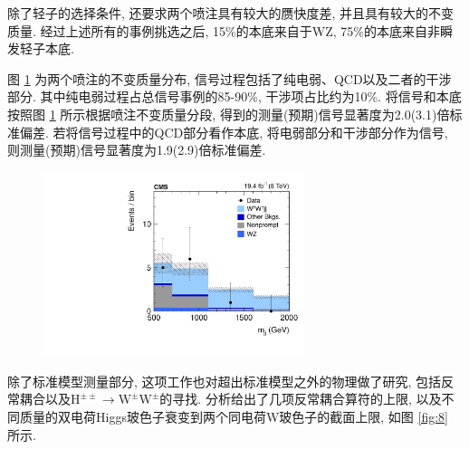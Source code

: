 \documentclass{SCIS2020cn}
\newcommand{\Wboson}{\text{W}}
\newcommand{\Hboson}{\text{H}}
\begin{document}
除了轻子的选择条件, 还要求两个喷注具有较大的赝快度差, 并且具有较大的不变质量. 经过上述所有的事例挑选之后, 15\%的本底来自于WZ, 75\%的本底来自非瞬发轻子本底. 

图 \ref{fig:7} 为两个喷注的不变质量分布, 信号过程包括了纯电弱、QCD以及二者的干涉部分. 其中纯电弱过程占总信号事例的85-90\%, 干涉项占比约为10\%. 将信号和本底按照图 \ref{fig:7} 所示根据喷注不变质量分段, 得到的测量(预期)信号显著度为2.0(3.1)倍标准偏差. 若将信号过程中的QCD部分看作本底, 将电弱部分和干涉部分作为信号, 则测量(预期)信号显著度为1.9(2.9)倍标准偏差. 

\begin{figure}[ht!]
\centering
\includegraphics[width=3in]{Figure-7.pdf}
\label{fig:7}
\end{figure}

除了标准模型测量部分, 这项工作也对超出标准模型之外的物理做了研究, 包括反常耦合以及$\Hboson^{\pm \pm} \rightarrow \Wboson^{\pm} \Wboson^{\pm}$的寻找. 分析给出了几项反常耦合算符的上限, 以及不同质量的双电荷Higgs玻色子衰变到两个同电荷W玻色子的截面上限, 如图 \ref{fig:8} 所示. 
\end{document}

